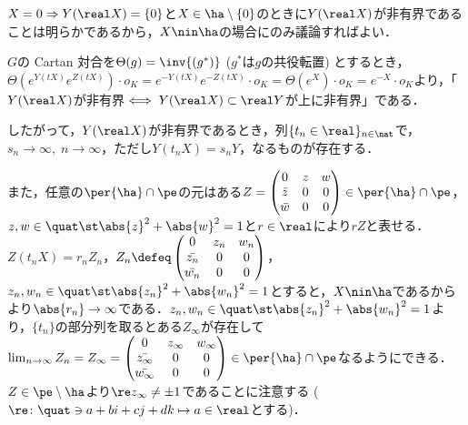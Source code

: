 \begin{npfwn}
  
  $X = 0\Rightarrow Y(\real X) = \{0\} $と$X\in \ha\setminus\{0\} $のときに$Y(\real X) $が非有界であることは明らかであるから，$X\nin \ha $の場合にのみ議論すればよい．%

  $G$の Cartan 対合を$\Theta(g) = \inv{(g^{*})} $ ($g^{*}$は$g$の共役転置) とするとき，$\Theta(e^{Y(tX)}e^{Z(tX)})\cdot o_K = e^{-Y(tX)}e^{-Z(tX)}\cdot o_K = \Theta(e^{X})\cdot o_K = e^{-X}\cdot o_K $より，「$Y(\real X) $が非有界$\iff Y(\real X)\subset \real Y $が上に非有界」である．

  したがって，$Y (\real X) $が非有界であるとき，列$\{t_n \in \real \}_{n\in \nat} $で，$s_n\to \infty,\; n\to \infty$，ただし$Y(t_n X) = s_n Y$，なるものが存在する．

  また，任意の$\per{\ha}\cap\pe $の元はある$Z =
  \begin{pmatrix}
    0 & z & w \\
    \bar{z} & 0 & 0 \\
    \bar{w} & 0 & 0 
  \end{pmatrix} \in \per{\ha}\cap\pe $，$z,w\in \quat \st \abs{z}^2 +\abs{w}^2  = 1 $と$r\in \real$により$rZ$と表せる．$Z(t_nX) = r_nZ_n$，$Z_n\defeq \begin{pmatrix}
    0 & z_n & w_n \\
    \bar{z_n} & 0 & 0 \\
    \bar{w_n} & 0 & 0 
  \end{pmatrix} $，$z_n,w_n\in \quat \st \abs{z_n}^2 +\abs{w_n}^2  = 1 $とすると，$X\nin\ha$であるからより$\abs{r_n}\to \infty $である．$z_n,w_n\in \quat \st \abs{z_n}^2 +\abs{w_n}^2  = 1 $より，$\{t_n\} $の部分列を取るとある$Z_{\infty} $が存在して$\lim_{n\to \infty}Z_n = Z_{\infty} =
  \begin{pmatrix}
    0 & z_{\infty} & w_{\infty} \\
    \bar{z_{\infty}} & 0 & 0 \\
    \bar{w_{\infty}} & 0 & 0 
  \end{pmatrix}
  \in \per{\ha}\cap\pe $なるようにできる．$Z\in\pe\setminus \ha $より$\re z_{\infty} \neq \pm 1$であることに注意する ($\re\colon \quat\ni a+bi+cj+dk\mapsto a\in \real$とする)．


\end{npfwn}
